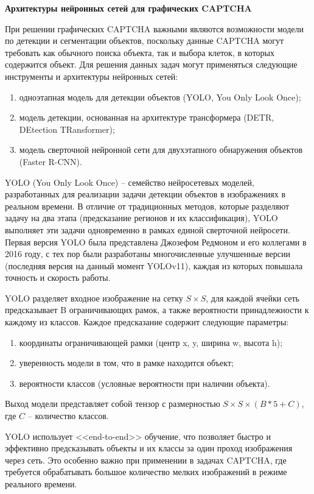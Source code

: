 \textbf{Архитектуры нейронных сетей для графических CAPTCHA}

При решении графических CAPTCHA важными являются возможности модели по детекции
и сегментации объектов, поскольку данные CAPTCHA могут требовать как обычного 
поиска объекта, так и выбора клеток, в которых содержится объект. Для решения 
данных задач могут применяться следующие инструменты и архитектуры нейронных 
сетей:

\begin{enumerate}
    \item одноэтапная модель для детекции объектов (YOLO, You Only Look Once);
    \item модель детекции, основанная на архитектуре трансформера (DETR, 
    DEtection TRansformer);
    \item модель сверточной нейронной сети для двухэтапного обнаружения объектов 
    (Faster R-CNN).
\end{enumerate}

YOLO (You Only Look Once) -- семейство нейросетевых моделей, разработанных для 
реализации задачи детекции объектов в изображениях в реальном времени. В отличие 
от традиционных методов, которые разделяют задачу на два этапа (предсказание 
регионов и их классификация), YOLO выполняет эти задачи одновременно в рамках 
единой сверточной нейросети. Первая версия YOLO была представлена Джозефом 
Редмоном и его коллегами в 2016 году, с тех пор были разработаны многочисленные 
улучшенные версии (последняя версия на данный момент YOLOv11), каждая из которых 
повышала точность и скорость работы.

YOLO разделяет входное изображение на сетку $S \times S$, для каждой ячейки сеть 
предсказывает B ограничивающих рамок, а также вероятности принадлежности к 
каждому из классов. Каждое предсказание содержит следующие параметры:

\begin{enumerate}
    \item координаты ограничивающей рамки (центр x, y, ширина w, высота h);
    \item уверенность модели в том, что в рамке находится объект;
    \item вероятности классов (условные вероятности при наличии объекта).
\end{enumerate}

Выход модели представляет собой тензор с размерностью $S \times S \times (B * 5 + 
C)$, где $C$ -- количество классов.

YOLO использует <<end-to-end>> обучение, что позволяет быстро и эффективно 
предсказывать объекты и их классы за один проход изображения через сеть. Это 
особенно важно при применении в задачах CAPTCHA, где требуется обрабатывать 
большое количество мелких изображений в режиме реального времени.

